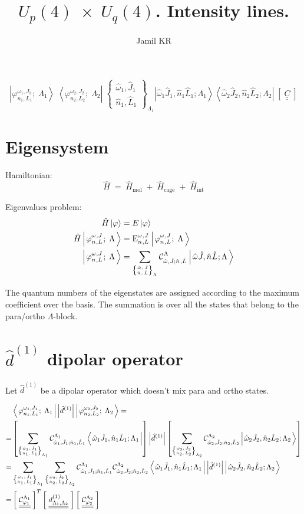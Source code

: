 \documentclass[english,twoside, openright]{report}
\author{Jamil KR}
\title{$U_p(4)\; \times\; U_q(4)$. Intensity lines.}
\newcommand{\eigket}[1]{
  \left| \left. \varphi^{\omega_{#1},J_{#1}}_{n_{#1},L_{#1}};\;\Lambda_{#1}\right.\right\rangle
}
\newcommand{\eigbra}[1]{
  \left\langle \left. \varphi^{\omega_{#1},J_{#1}}_{n_{#1},L_{#1}};\;\Lambda_{#1}\right.\right|
}
\newcommand{\eigval}[1]{
  \text{E}^{\omega_{#1},J_{#1}}_{n_{#1},L_{#1}}
}
\newcommand{\lamblock}[1]{
  \left\{
    \begin{matrix}
      \hat{\omega}_{#1} , \hat{J}_{#1} \\
      \hat{n}_{#1} , \hat{L}_{#1} 
    \end{matrix}
  \right\}_{\Lambda_{#1}} 
}
\newcommand{\coef}[1]{
  \mathcal{C}^{\Lambda_{#1}}_{\hat{\omega}_{#1},\hat{J}_{#1};\hat{n}_{#1},\hat{L}_{#1}}
}
\newcommand{\coefm}[1]{
  \mathcal{C}^{\Lambda_{#1}}_{\varphi_{#1}}
}
\newcommand{\pqket}[1]{
  \left| \left. \hat{\omega}_{#1} \hat{J}_{#1},\hat{n}_{#1}\hat{L}_{#1} ; \Lambda_{#1} \right.\right\rangle
}
\newcommand{\pqbra}[1]{
  \left\langle \left. \hat{\omega}_{#1} \hat{J}_{#1},\hat{n}_{#1}\hat{L}_{#1} ; \Lambda_{#1} \right.\right|
}
\newcommand{\ppmat}[1]{
  \left[\;
    \underline{\underline{
        #1
      }}
  \;\right]
}
\begin{document}
\maketitle

\begin{equation}
  \eigket{1} \; \eigbra{2} \; \lamblock{1} \pqket{1} \pqbra{2}\; \ppmat{C}
\end{equation}

\section{Eigensystem}
Hamiltonian:
\begin{equation}
  \hat{H} \; = \; \hat{H}_{\text{mol}} \; + \; \hat{H}_{\text{cage}} \;+\; \hat{H}_{\text{int}}
\end{equation}

Eigenvalues problem:
\begin{align}
  \hat{H}\ket{\varphi}&=E\ket{\varphi} \nonumber \\
  \hat{H}\eigket{} &= \eigval{}\eigket{} \\
  \eigket{} & = \sum\limits_{\tiny{\lamblock{}}} \coef{} \pqket{} \nonumber
\end{align}

The quantum numbers of the eigenstates are assigned according to the
maximum coefficient over the basis. The summation is over all the
states that belong to the para/ortho $\Lambda$-block.

\section{$\hat{d}^{(1)}$  dipolar operator}
Let $\hat{d}^{(1)}$ be a dipolar operator which doesn't mix para and ortho states.

\begin{align}
  & \eigbra{1}\left|\hat{d}^{(1)}\right| \eigket{2}  = \\
  = & \left[\sum\limits_{\tiny{\lamblock{1}}}
      \coef{1}\pqbra{1}
      \right]
      \left|\hat{d}^{(1)}\right|
      \left[\sum\limits_{\tiny{\lamblock{2}}}
      \coef{2}\pqket{2}
      \right] \nonumber \\
  = & \sum\limits_{\tiny{\lamblock{1}}} \sum\limits_{\tiny{\lamblock{2}}}
      \coef{1}\coef{2}\pqbra{1} \left|\hat{d}^{(1)}\right| \pqket{2} \nonumber \\
  = & \ppmat{\coefm{1}}^{T} \ppmat{d^{(1)}_{\Lambda_1,\Lambda_2}} \ppmat{\coefm{2}}
\end{align}
\end{document}
